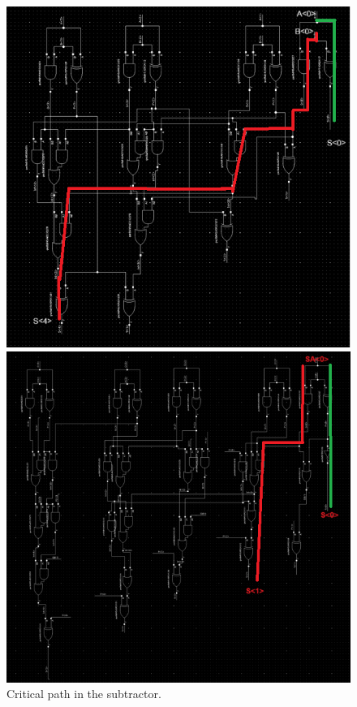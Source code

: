 \documentclass[a4paper,12pt]{article}
\begin{document}
\begin{figure}[H] \centering \begin{minipage}{0.49\textwidth} \centering \includegraphics[width=\textwidth]{images/CP_ADD} \caption{Critical path in the adder.} \end{minipage} \hfill \begin{minipage}{0.49\textwidth} \centering \includegraphics[width=\textwidth]{images/CP_SUB} \caption{Critical path in the subtractor.} \end{minipage} \end{figure}
\end{document}
